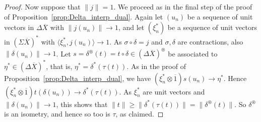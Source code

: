 \documentclass[a4paper,11pt]{article}
\theoremstyle{plain}
\theoremstyle{remark}
\newcommand{\ip}[2]{{\langle {#1} , {#2} \rangle}}
\newcommand{\intdual}{\circledast}
\begin{document}
\begin{proof}
Now suppose that $\|j\|=1$.  We proceed as in the final step of the proof of Proposition~\ref{prop:Delta_interp_dual}.  Again let $(u_n)$ be a sequence of unit vectors in $\Delta\overline X$ with $\|j(u_n)\|\to 1$, and let $(\xi_n^*)$ be a sequence of unit vectors in $(\Sigma\overline X)^*$ with $\ip{\xi_n^*}{j(u_n)} \to 1$.  As $\sigma\circ\delta = j$ and $\sigma, \delta$ are contractions, also $\|\delta(u_n)\|\to 1$.  Let $s = \delta^\intdual(t) = t\circ \delta \in (\Delta\overline X)^\intdual$ be associated to $\eta^* \in (\Delta\overline X)^*$, that is, $\eta^* = \delta^*(\tau(t))$.  As in the proof of Proposition~\ref{prop:Delta_interp_dual}, we have $(\xi_n^*\otimes\overline 1) s(u_n) \to \eta^*$.
Hence $(\xi_n^*\otimes\overline 1) t(\delta(u_n)) \to \delta^*(\tau(t))$.  As $\xi_n^*$ are unit vectors and $\|\delta(u_n)\|\to 1$, this shows that $\|t\| \geq \|\delta^*(\tau(t))\| = \|\delta^\intdual(t)\|$.  So $\delta^\intdual$ is an isometry, and hence so too is $\tau$, as claimed.
\end{proof}





\end{document}
